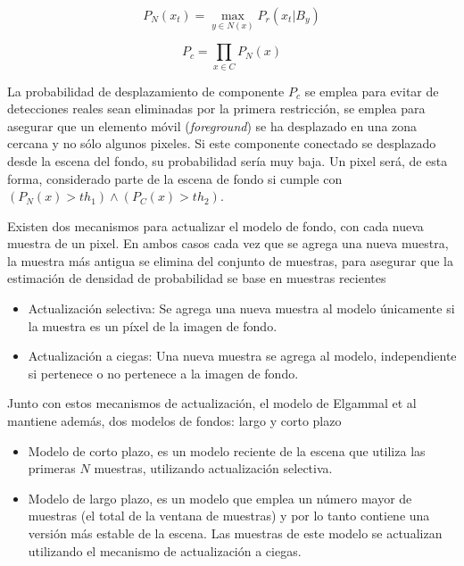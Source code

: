 \begin{equation}\label{eq:displacement_probability}
P_N{(x_t)} = \max_{y \in N(x)} P_r(x_t | B_y)
\end{equation}

\begin{equation}
P_c = \prod_{x \in C} P_N{(x)}
\end{equation}

La probabilidad de desplazamiento de componente $P_c$ se emplea para evitar de detecciones reales sean eliminadas por la primera restricción, se emplea para asegurar que un elemento móvil (\textit{foreground}) se ha desplazado en una zona cercana y no sólo algunos pixeles. Si este componente conectado se desplazado desde la escena del fondo, su probabilidad sería muy baja. Un pixel será, de esta forma, considerado parte de la escena de fondo si cumple con $(P_N(x) > th_1) \wedge (P_C(x) > th_2)$.


Existen dos mecanismos para actualizar el modelo de fondo, con cada nueva muestra de un pixel. En ambos casos cada vez que se agrega una nueva muestra, la muestra más antigua se elimina del conjunto de muestras, para asegurar que la estimación de densidad de probabilidad se base en muestras recientes

\begin{itemize}
\item Actualización selectiva: Se agrega una nueva muestra al modelo únicamente si la muestra es un píxel de la imagen de fondo.
\item Actualización a ciegas: Una nueva muestra se agrega al modelo, independiente si pertenece o no pertenece a la imagen de fondo.
\end{itemize}

 Junto con estos mecanismos de actualización, el modelo de Elgammal et al\cite{elgammal_nonparametricmodel_2000} mantiene además, dos modelos de fondos: largo y corto plazo 

\begin{itemize}
\item Modelo de corto plazo, es un modelo reciente de la escena que utiliza las primeras $N$ muestras, utilizando actualización selectiva.
\item Modelo de largo plazo, es un modelo que emplea un número mayor de muestras (el total de la ventana de muestras) y por lo tanto contiene una versión más estable de la escena. Las muestras de este modelo se actualizan utilizando el mecanismo de actualización a ciegas.
\end{itemize}

